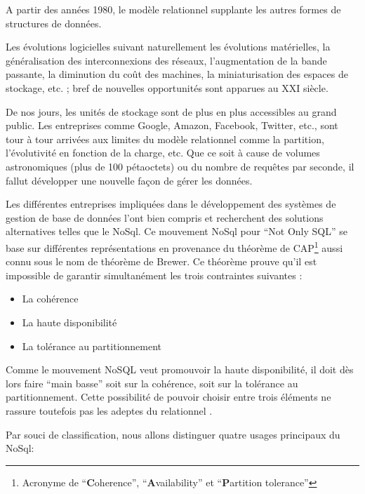 \documentclass[a4paper,fleqn,12pt,oneside]{report}
\begin{document}
A partir des années 1980, le modèle relationnel supplante les autres formes de structures de données.

Les évolutions logicielles suivant naturellement les évolutions matérielles, la généralisation des interconnexions des réseaux, l'augmentation de la bande passante, la diminution du coût des machines, la miniaturisation des espaces de stockage, etc. ; bref de nouvelles opportunités sont apparues au XXI siècle.

De nos jours, les unités de stockage sont de plus en plus accessibles au grand public. Les entreprises comme Google, Amazon, Facebook, Twitter, etc., sont tour à tour arrivées aux limites du modèle relationnel \cite{frishman1998comprehensive} comme la partition, l'évolutivité en fonction de la charge, etc. Que ce soit à cause de volumes astronomiques (plus de 100 pétaoctets) ou du nombre de requêtes par seconde, il fallut développer une nouvelle façon de gérer les données.

Les différentes entreprises impliquées dans le développement des systèmes de gestion de base de données l'ont bien compris et recherchent des solutions alternatives telles que le NoSql\cite{nance2013nosql}. Ce mouvement NoSql pour \enquote{Not Only SQL} se base sur différentes représentations en provenance du théorème de CAP\footnote{Acronyme de \enquote{\textbf{C}oherence}, \enquote{\textbf{A}vailability} et \enquote{\textbf{P}artition tolerance}} aussi connu sous le nom de théorème de Brewer. Ce théorème prouve qu’il est impossible de garantir simultanément les trois contraintes suivantes : \newpage
\begin{itemize}
\item La cohérence
\item La haute disponibilité
\item La tolérance au partitionnement
\end{itemize}

Comme le mouvement
NoSQL veut promouvoir la haute disponibilité, il doit dès lors faire \enquote{main basse} soit sur la
cohérence, soit sur la tolérance au partitionnement. Cette possibilité de pouvoir choisir entre
trois éléments ne rassure toutefois pas les adeptes du relationnel \cite{di2012adoption}.

Par souci de classification, nous allons distinguer quatre usages principaux du NoSql:
\end{document}
